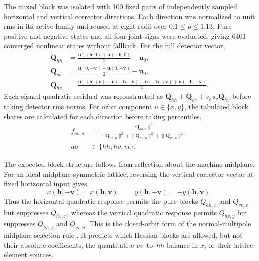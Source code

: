 \documentclass[letterpaper]{jacow}
\begin{document}
The mixed block was isolated with 100 fixed pairs of independently sampled
horizontal and vertical corrector directions.  Each direction was normalized
to unit rms in its active family and reused at eight radii over
$0.1\leq\rho\leq1.13$.  Pure positive and negative states and all four joint
signs were evaluated, giving 6401 converged nonlinear states without fallback.
For the full detector vector,
\begin{align}
  \bm Q_{hh} &= \frac{\bm u(+\bm h,0)+\bm u(-\bm h,0)}{2}-\bm u_0,\\
  \bm Q_{vv} &= \frac{\bm u(0,+\bm v)+\bm u(0,-\bm v)}{2}-\bm u_0,\\
  \bm Q_{hv} &= \frac{\bm u(+\bm h,+\bm v)-\bm u(+\bm h,-\bm v)
  -\bm u(-\bm h,+\bm v)+\bm u(-\bm h,-\bm v)}{4}.
  \label{eq:mixedblocks}
\end{align}
Each signed quadratic residual was reconstructed as
$\bm Q_{hh}+\bm Q_{vv}+s_hs_v\bm Q_{hv}$ before taking detector rms norms.
For orbit component $u\in\{x,y\}$, the tabulated block shares are calculated for
each direction before taking percentiles,
\begin{equation}
 \begin{aligned}
 f_{ab,u}&=\frac{\lVert\bm Q_{ab,u}\rVert^2}
 {\lVert\bm Q_{hh,u}\rVert^2+\lVert\bm Q_{hv,u}\rVert^2+
  \lVert\bm Q_{vv,u}\rVert^2},\\[-1mm]
 ab&\in\{hh,hv,vv\}.
 \end{aligned}
 \label{eq:blockshare}
\end{equation}

The expected block structure follows from reflection about the machine
midplane.  For an ideal midplane-symmetric lattice, reversing the vertical
corrector vector at fixed horizontal input gives
\begin{equation}
 x(\bm h,-\bm v)=x(\bm h,\bm v), \qquad
 y(\bm h,-\bm v)=-y(\bm h,\bm v).
 \label{eq:selection}
\end{equation}
Thus the horizontal quadratic response permits the pure blocks $Q_{hh,x}$ and
$Q_{vv,x}$ but suppresses $Q_{hv,x}$, whereas the vertical quadratic response
permits $Q_{hv,y}$ but suppresses $Q_{hh,y}$ and $Q_{vv,y}$.  This is the
closed-orbit form of the normal-multipole midplane selection rule
\cite{wolski2011}.  It predicts which Hessian blocks are allowed, but not their
absolute coefficients, the quantitative $vv$--to--$hh$ balance in $x$, or
their lattice-element sources.
\end{document}
